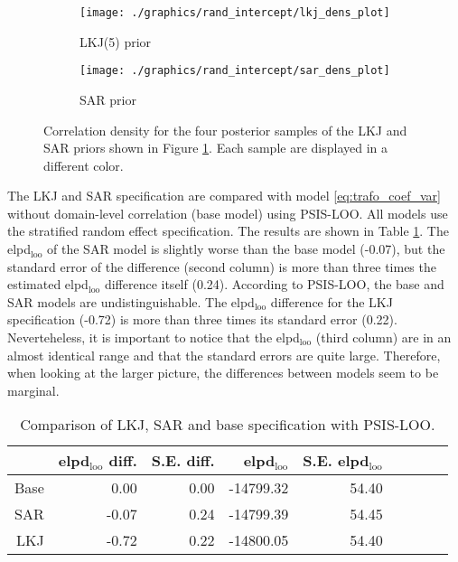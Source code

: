 \begin{figure}
    \begin{subfigure}{0.49\linewidth}
        \texttt{[image: ./graphics/rand\_intercept/lkj\_dens\_plot]}
        \caption{LKJ(5) prior}
    \end{subfigure}
    \begin{subfigure}{0.49\linewidth}
        \texttt{[image: ./graphics/rand\_intercept/sar\_dens\_plot]}
        \caption{SAR prior}
    \end{subfigure}
    \caption[Correlation density for the LKJ and SAR priors]{Correlation density for the four posterior samples of the LKJ and SAR priors shown in Figure \ref{fig:corr_density}. Each sample are displayed in a different color.}
    \label{fig:corr_density}
\end{figure}


The LKJ and SAR specification are compared with model \ref{eq:trafo_coef_var} without domain-level correlation (base model) using PSIS-LOO.
All models use the stratified random effect specification.
The results are shown in Table \ref{tab:lkj_sar_base}.
The elpd$_{\text{loo}}$ of the SAR model is slightly worse than the base model (-0.07), but the standard error of the difference (second column) is more than three times the estimated elpd$_{\text{loo}}$ difference itself (0.24).
According to PSIS-LOO, the base and SAR models are undistinguishable.
The elpd$_{\text{loo}}$ difference for the LKJ specification (-0.72) is more than three times its standard error (0.22).
Neverteheless, it is important to notice that the elpd$_{\text{loo}}$ (third column) are in an almost identical range and that the standard errors are quite large.
Therefore, when looking at the larger picture, the differences between models seem to be marginal.

\begin{table}[ht]
    \centering
    \begin{tabular}{rrrrrrrrr}
        \hline
        & elpd$_{\text{loo}}$ diff. & S.E. diff. & elpd$_{\text{loo}}$ & S.E. elpd$_{\text{loo}}$  \\
        \hline
        Base & 0.00 & 0.00 & -14799.32 & 54.40  \\
        SAR & -0.07 & 0.24 & -14799.39 & 54.45  \\
        LKJ & -0.72 & 0.22 & -14800.05 & 54.40  \\
        \hline
    \end{tabular}
    \caption{Comparison of LKJ, SAR and base specification with PSIS-LOO.}
    \label{tab:lkj_sar_base}
\end{table}


